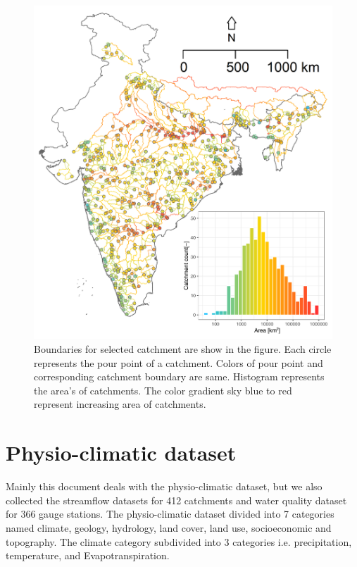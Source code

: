 \documentclass[a4paper, 12pt]{article}
\begin{document}
\begin{figure}[!h]
\centering
\includegraphics[width = 1\textwidth]{Figures/GaugeStation.png}
\caption{Boundaries for selected catchment are show in the figure. Each circle represents the pour point of a catchment. Colors of pour point and corresponding catchment boundary are same. Histogram represents the area's of catchments.  The color gradient sky blue to red represent increasing area of catchments.}
\label{fig:histCat}
\end{figure}

\clearpage
\section{Physio-climatic dataset} %
Mainly this document deals with the physio-climatic dataset, but we also collected the streamflow datasets for 412 catchments and water quality dataset for 366 gauge stations. The physio-climatic dataset divided into 7 categories named climate, geology, hydrology, land cover, land use, socioeconomic and topography. The climate category subdivided into 3 categories i.e. precipitation, temperature, and Evapotranspiration.
\end{document}
